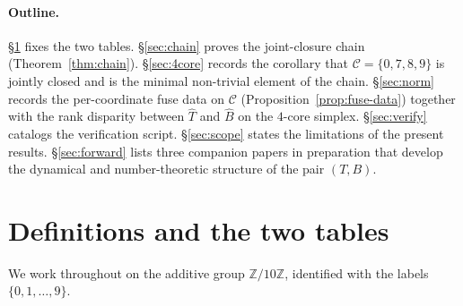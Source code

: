 \documentclass[11pt,reqno]{amsart}
\theoremstyle{plain}
\theoremstyle{definition}
\theoremstyle{remark}
\newcommand{\Z}{\mathbb{Z}}
\newcommand{\Zten}{\Z/10\Z}
\newcommand{\Cfour}{\mathcal{C}}
\newcommand{\Tfuse}{\widehat{T}}
\newcommand{\Bfuse}{\widehat{B}}
\begin{document}
\paragraph{Outline.} \S\ref{sec:setup} fixes the two tables.
\S\ref{sec:chain} proves the joint-closure chain
(Theorem~\ref{thm:chain}). \S\ref{sec:4core} records the
corollary that $\Cfour=\{0,7,8,9\}$ is jointly closed and is the
minimal non-trivial element of the chain. \S\ref{sec:norm}
records the per-coordinate fuse data on $\Cfour$
(Proposition~\ref{prop:fuse-data}) together with the rank
disparity between $\Tfuse$ and $\Bfuse$ on the $4$-core simplex.
\S\ref{sec:verify} catalogs the verification script.
\S\ref{sec:scope} states the limitations of the present results.
\S\ref{sec:forward} lists three companion papers in preparation
that develop the dynamical and number-theoretic structure of the
pair $(T,B)$.

\section{Definitions and the two tables}\label{sec:setup}

We work throughout on the additive group $\Zten$, identified with
the labels $\{0,1,\dots,9\}$.
\end{document}
